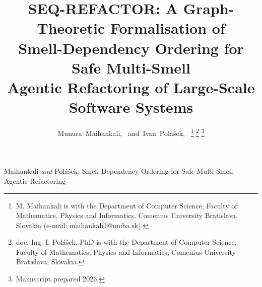 \documentclass[journal,onecolumn,11pt]{IEEEtran}
\begin{document}
\title{SEQ-REFACTOR: A Graph-Theoretic Formalisation of \\ Smell-Dependency Ordering for Safe Multi-Smell \\ Agentic Refactoring of Large-Scale Software Systems}

\author{Munura~Maihankali,~
        and~Ivan~Pol\'a\v{s}ek,~
\thanks{M. Maihankali is with the Department of Computer Science, Faculty of Mathematics, Physics and Informatics, Comenius University Bratislava, Slovakia (e-mail: maihankali1@uniba.sk).}
\thanks{doc. Ing. I. Pol\'a\v{s}ek, PhD is with the Department of Computer Science, Faculty of Mathematics, Physics and Informatics, Comenius University Bratislava, Slovakia.}
\thanks{Manuscript prepared 2026.}}

%
{Maihankali \MakeLowercase{\textit{and}} Pol\'a\v{s}ek: Smell-Dependency Ordering for Safe Multi-Smell Agentic Refactoring}

\maketitle
\end{document}
